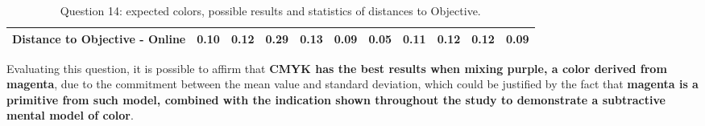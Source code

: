 \begin{table}[H]
{\begin{tabular}{lccccccccccccc}
    \multicolumn{4}{l}{Distance to Objective - Online}                                                                                               & \multicolumn{1}{|c}{0.10}        & \multicolumn{1}{c|}{0.12}    & \multicolumn{1}{|c}{0.29}        & \multicolumn{1}{c|}{0.13}    & \multicolumn{1}{|c}{\textbf{0.09}}       & \multicolumn{1}{c|}{0.05}    & \multicolumn{1}{|c}{0.11}        & \multicolumn{1}{c|}{0.12}    & \multicolumn{1}{|c}{0.12}       & \multicolumn{1}{c|}{0.09}    \\ \hline
    \end{tabular}}
  \caption[Question 14, with expected Results.]{Question 14: expected colors, possible results and statistics of distances to Objective.}
  \vspace{-5pt}
  \label{table:lab_q14_expected}
\end{table}
%
Evaluating this question, it is possible to affirm that \textbf{CMYK has the best results when mixing purple, a color derived from magenta}, due to the commitment between the mean value and standard deviation, which
could be justified by the fact that \textbf{magenta is a primitive from such model, combined with the indication shown throughout the study to demonstrate a subtractive mental model of color}.
%
